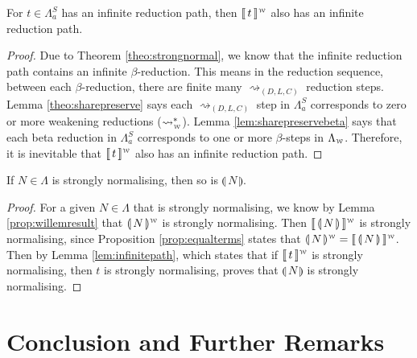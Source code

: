 \documentclass[a4paper,UKenglish,cleveref, autoref]{lipics-v2019}
\newcommand{\FALC}{\Lambda^{S}_{a}}
\newcommand{\WEAK}{\Lambda_{\weaksymbol}}
\newcommand{\compile}[1]{\llparenthesis \, #1 \, \rrparenthesis}
\newcommand{\weaksymbol}{\mbox{\tiny $\mathcal{W}$}}
\newcommand{\compweak}[1]{\llparenthesis \, #1 \, \rrparenthesis^{\weaksymbol}}
\newcommand{\composeweak}[1]{\llbracket \, #1 \, \rrbracket^{\weaksymbol}}
\begin{document}
\begin{lemma}
\label{lem:infinitepath}
For $t \in \FALC$ has an infinite reduction path, then $\composeweak{t}$ also has an infinite reduction path.
\end{lemma}

\begin{proof}
Due to Theorem \ref{theo:strongnormal}, we know that the infinite reduction path contains an infinite $\beta$-reduction. This means in the reduction sequence, between each $\beta$-reduction, there are finite many $\rightsquigarrow_{(D, L, C)}$ reduction steps. Lemma \ref{theo:sharepreserve} says each $\rightsquigarrow_{(D, L, C)}$ step in $\FALC$ corresponds to zero or more weakening reductions ($\rightsquigarrow^{*}_{\weaksymbol}$). Lemma \ref{lem:sharepreservebeta} says that each beta reduction in $\FALC$ corresponds to one or more $\beta$-steps in $\WEAK$. Therefore, it is inevitable that $\composeweak{t}$ also has an infinite reduction path.
\end{proof}


%

\begin{theorem}
 If $N \in \Lambda$ is strongly normalising, then so is $\compile{N}$.
\end{theorem}

\begin{proof}
For a given $N \in \Lambda$ that is strongly normalising, we know by Lemma \ref{prop:willemresult} that $\compweak{N}$ is strongly normalising. Then $\composeweak{\compile{N}}$ is strongly normalising, since Proposition \ref{prop:equalterms} states that $\compweak{N} = \composeweak{\compile{N}}$. Then by Lemma \ref{lem:infinitepath}, which states that if $\composeweak{t}$ is strongly normalising, then $t$ is strongly normalising, proves that $\compile{N}$ is strongly normalising.
\end{proof}

\section{Conclusion and Further Remarks}
\label{chap:conc}
\end{document}
